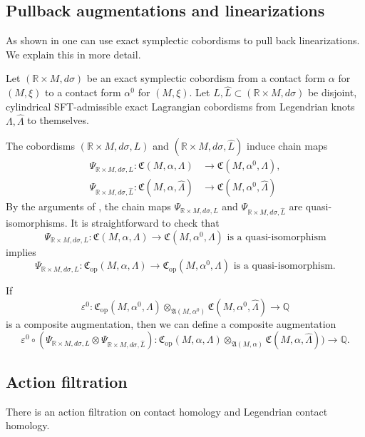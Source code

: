 \documentclass[JEP,XML,SOM,Unicode,NoFloatCountersInSection]{cedram}
\let\epsilon\varepsilon
\newcommand{\opp}{\mathrm{op}}
\theoremstyle{plain}
\theoremstyle{definition}
\numberwithin{equation}{subsection}
\newcommand{\RR}{\mathbb{R}}
\begin{document}
\subsection{Pullback augmentations and linearizations}

As shown in \cite{BEE} one can use exact symplectic cobordisms to pull back linearizations. We explain this in more detail.

Let $(\mathbb{R}\times M,d\sigma)$ be an exact symplectic cobordism from a contact form $\alpha$ for $(M,\xi)$ to a contact form $\alpha^0$ for $(M,\xi)$. Let $L,\widehat{L} \subset (\mathbb{R}\times M,d\sigma)$ be disjoint, \hbox{cylindrical} SFT\nobreakdash-admissible exact Lagrangian cobordisms from Legendrian knots $\Lambda,\widehat{\Lambda}$ to themselves.

The cobordisms $(\RR\times M,d\sigma,L)$ and $(\RR\times M,d\sigma,\widehat{L})$ induce chain maps
\begin{align*}
\Psi_{\RR\times M,d\sigma,L}:\mathfrak{C}(M,\alpha,\Lambda) &\to \mathfrak{C}(M,\alpha^0,\Lambda),\\
\Psi_{\RR\times M, d\sigma,\widehat{L}}: \mathfrak{C}(M,\alpha,\widehat\Lambda) &\to \mathfrak{C}(M,\alpha^0,\widehat\Lambda)
\end{align*}
By the arguments of \cite{BEE,SFT}, the chain maps $\Psi_{\RR\times M,d\sigma,L}$ and $\Psi_{\RR\times M,d\sigma,\widehat{L}}$ are quasi-isomorphisms. It is straightforward to check that
$$\Psi_{\RR\times M,d\sigma,L}:\mathfrak{C}(M,\alpha,\Lambda) \to \mathfrak{C}(M,\alpha^0,\Lambda)\text{ is a quasi-isomorphism}$$ implies $$\Psi_{\RR\times M,d\sigma,L}:\mathfrak{C}_{\opp}(M,\alpha,\Lambda) \to \mathfrak{C}_{\opp}(M,\alpha^0,\Lambda)\text{ is a quasi-isomorphism.}$$

If $$\epsilon^0 : \mathfrak{C}_{\opp}(M,\alpha^0,\Lambda)\otimes_{\mathfrak{A}(M,\alpha^0)} \mathfrak{C}(M,\alpha^0,\widehat{\Lambda}) \to \mathbb{Q}$$
is a composite augmentation, then we can define a composite augmentation
$$\epsilon^0 \circ (\Psi_{\RR\times M,d\sigma,L}\otimes \Psi_{\RR\times M, d\sigma,\widehat{L}}): \mathfrak{C}_{\opp}(M,\alpha,\Lambda)\otimes_{\mathfrak{A}(M,\alpha)} \mathfrak{C}(M,\alpha,\widehat{\Lambda})) \to \mathbb{Q}.$$

\subsection{Action filtration}

There is an action filtration on contact homology and Legendrian contact homology.
\end{document}
